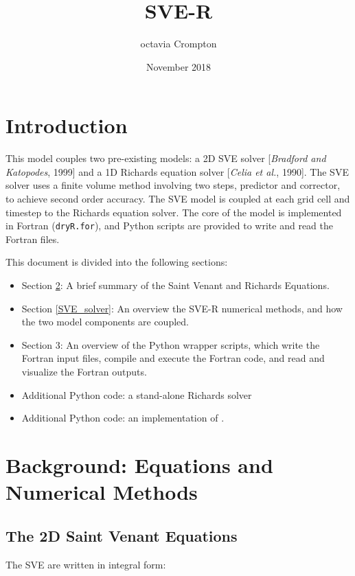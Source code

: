 \documentclass{article}
\title{SVE-R}
\author{octavia Crompton}
\date{November 2018}
\newcommand{\code}[1]{\texttt{#1}}
\begin{document}
\tableofcontents		

\section{Introduction}

This model couples two pre-existing models: a 2D SVE solver [\textit{Bradford and Katopodes}, 1999] and a 1D Richards equation solver [\textit{Celia et al.}, 1990].	
The SVE solver uses a finite volume method involving two steps, predictor and corrector, to achieve second order accuracy.  The SVE model is coupled at each grid cell and timestep to the Richards equation solver.
The core of the model is implemented in Fortran  (\code{dryR.for}), and Python  scripts are provided to write and read the Fortran files.
 
This document is divided into the following sections:

\begin{itemize}
	\item Section \ref{SVE}: A brief summary of the Saint Venant and Richards Equations.
	\item Section \ref{SVE_solver}:  An overview the SVE-R numerical methods, and how the two model components are coupled. 
	\item Section 3: An overview of the Python wrapper scripts,  which write the Fortran input files, compile and execute the Fortran code, and read and visualize the Fortran outputs. 
	\item  Additional Python code: a stand-alone Richards solver 
	\item  Additional Python code: an implementation of \citet{GW1996}.
\end{itemize}		

\section{Background: Equations and Numerical Methods }
\label{SVE}

\subsection{The 2D Saint Venant Equations}
The SVE are written in integral form:
\end{document}

